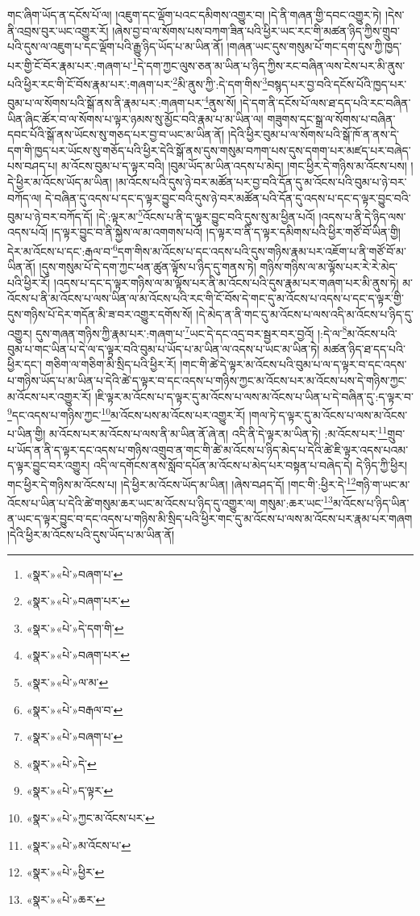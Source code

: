 གང་ཞིག་ཡོད་ན་དངོས་པོ་ལ། །འཇུག་དང་ལྡོག་པའང་དམིགས་འགྱུར་བ། །དེ་ནི་གཞན་གྱི་དབང་འགྱུར་ཏེ། །དེས་ནི་འབྲས་བུར་ཡང་འགྱུར་རོ། །ཞེས་བྱ་བ་ལ་སོགས་པས་བཀག་ཟིན་པའི་ཕྱིར་ཡང་རང་གི་མཚན་ཉིད་ཀྱིས་གྲུབ་པའི་དུས་ལ་འཇུག་པ་དང་ལྡོག་པའི་རྒྱུ་ཉིད་ཡོད་པ་མ་ཡིན་ནོ། །གཞན་ཡང་དུས་གསུམ་པོ་གང་དག་དུས་ཀྱི་ཁྱད་པར་གྱི་ངོ་བོར་རྣམ་པར་:གཞག་པ་\footnote{«སྣར་»«པེ་»བཞག་པ་}དེ་དག་ཀྱང་ལུས་ཅན་མ་ཡིན་པ་ཉིད་ཀྱིས་རང་བཞིན་ལས་ངེས་པར་མི་ནུས་པའི་ཕྱིར་རང་གི་ངོ་བོས་རྣམ་པར་:གཞག་པར་\footnote{«སྣར་»«པེ་»བཞག་པར་}མི་ནུས་ཀྱི་:དེ་དག་གིས་\footnote{«སྣར་»«པེ་»དེ་དག་གི་}བསྙད་པར་བྱ་བའི་དངོས་པོའི་ཁྱད་པར་བུམ་པ་ལ་སོགས་པའི་སྒོ་ནས་ནི་རྣམ་པར་:གཞག་པར་\footnote{«སྣར་»«པེ་»བཞག་པར་}ནུས་སོ། །དེ་དག་ནི་དངོས་པོ་ལས་ཐ་དད་པའི་རང་བཞིན་ཡིན་ཞིང་ཚོར་བ་ལ་སོགས་པ་ལྟར་ཉམས་སུ་མྱོང་བའི་རྣམ་པ་མ་ཡིན་ལ། གཟུགས་དང་སྒྲ་ལ་སོགས་པ་བཞིན་དབང་པོའི་སྒོ་ནས་ཡོངས་སུ་གཅད་པར་བྱ་བ་ཡང་མ་ཡིན་ནོ། །དེའི་ཕྱིར་བུམ་པ་ལ་སོགས་པའི་སྒོ་ཁོ་ན་ནས་དེ་དག་གི་ཁྱད་པར་ཡོངས་སུ་གཅོད་པའི་ཕྱིར་དེའི་སྒོ་ནས་དུས་གསུམ་བཀག་པས་དུས་དགག་པར་མཛད་པར་བཞེད་པས་བཤད་པ། མ་འོངས་བུམ་པ་ད་ལྟར་བའི། །བུམ་ཡོད་མ་ཡིན་འདས་པ་མེད། །གང་ཕྱིར་དེ་གཉིས་མ་འོངས་པས། །དེ་ཕྱིར་མ་འོངས་ཡོད་མ་ཡིན། །མ་འོངས་པའི་དུས་ཉེ་བར་མཚོན་པར་བྱ་བའི་དོན་དུ་མ་འོངས་པའི་བུམ་པ་ཉེ་བར་བཀོད་ལ། དེ་བཞིན་དུ་འདས་པ་དང་ད་ལྟར་བྱུང་བའི་དུས་ཉེ་བར་མཚོན་པའི་དོན་དུ་འདས་པ་དང་ད་ལྟར་བྱུང་བའི་བུམ་པ་ཉེ་བར་བཀོད་དོ། །དེ་:ལྟར་མ་\footnote{«སྣར་»«པེ་»ལ་མ་}འོངས་པ་ནི་ད་ལྟར་བྱུང་བའི་དུས་སུ་མ་ཕྱིན་པའོ། །འདས་པ་ནི་དེ་ཉིད་ལས་འདས་པའོ། །ད་ལྟར་བྱུང་བ་ནི་སྐྱེས་ལ་མ་འགགས་པའོ། །ད་ལྟར་བ་ནི་ད་ལྟར་དམིགས་པའི་ཕྱིར་གཙོ་བོ་ཡིན་གྱི། དེར་མ་འོངས་པ་དང་:རྒལ་བ་\footnote{«སྣར་»«པེ་»བརྒལ་བ་}དག་གིས་མ་འོངས་པ་དང་འདས་པའི་དུས་གཉིས་རྣམ་པར་འཇོག་པ་ནི་གཙོ་བོ་མ་ཡིན་ནོ། །དུས་གསུམ་པོ་དེ་དག་ཀྱང་ཕན་ཚུན་ལྟོས་པ་ཉིད་དུ་གནས་ཏེ། གཉིས་གཉིས་ལ་མ་ལྟོས་པར་རེ་རེ་མེད་པའི་ཕྱིར་རོ། །འདས་པ་དང་ད་ལྟར་གཉིས་ལ་མ་ལྟོས་པར་ནི་མ་འོངས་པའི་དུས་རྣམ་པར་གཞག་པར་མི་ནུས་ཏེ། མ་འོངས་པ་ནི་མ་འོངས་པ་ལས་ཡིན་ལ་མ་འོངས་པའི་རང་གི་ངོ་བོས་དེ་གང་དུ་མ་འོངས་པ་འདས་པ་དང་ད་ལྟར་གྱི་དུས་གཉིས་པོ་དེར་གདོན་མི་ཟ་བར་འགྱུར་དགོས་སོ། །དེ་མེད་ན་ནི་གང་དུ་མ་འོངས་པ་ལས་འདི་མ་འོངས་པ་ཉིད་དུ་འགྱུར། དུས་གཞན་གཉིས་ཀྱི་རྣམ་པར་:གཞག་པ་\footnote{«སྣར་»«པེ་»བཞག་པ་}ཡང་དེ་དང་འདྲ་བར་སྦྱར་བར་བྱའོ། །:དེ་ལ་\footnote{«སྣར་»«པེ་»དེ་}མ་འོངས་པའི་བུམ་པ་གང་ཡིན་པ་དེ་ལ་ད་ལྟར་བའི་བུམ་པ་ཡོད་པ་མ་ཡིན་ལ་འདས་པ་ཡང་མ་ཡིན་ཏེ། མཚན་ཉིད་ཐ་དད་པའི་ཕྱིར་དང་། གཅིག་ལ་གཅིག་མི་སྲིད་པའི་ཕྱིར་རོ། །གང་གི་ཚེ་དེ་ལྟར་མ་འོངས་པའི་བུམ་པ་ལ་ད་ལྟར་བ་དང་འདས་པ་གཉིས་ཡོད་པ་མ་ཡིན་པ་དེའི་ཚེ་ད་ལྟར་བ་དང་འདས་པ་གཉིས་ཀྱང་མ་འོངས་པར་མ་འོངས་པས་དེ་གཉིས་ཀྱང་མ་འོངས་པར་འགྱུར་རོ། །ཇི་ལྟར་མ་འོངས་པ་ད་ལྟར་དུ་མ་འོངས་པ་ལས་མ་འོངས་པ་ཡིན་པ་དེ་བཞིན་དུ་:ད་ལྟར་བ་\footnote{«སྣར་»«པེ་»ད་ལྟར་}དང་འདས་པ་གཉིས་ཀྱང་\footnote{«སྣར་»«པེ་»ཀྱང་མ་འོངས་པར་}མ་འོངས་པས་མ་འོངས་པར་འགྱུར་རོ། །གལ་ཏེ་ད་ལྟར་དུ་མ་འོངས་པ་ལས་མ་འོངས་པ་ཡིན་གྱི། མ་འོངས་པར་མ་འོངས་པ་ལས་ནི་མ་ཡིན་ནོ་ཞེ་ན། འདི་ནི་དེ་ལྟར་མ་ཡིན་ཏེ། :མ་འོངས་པར་\footnote{«སྣར་»«པེ་»མ་འོངས་པ་}གྲུབ་པ་ཡོད་ན་ནི་ད་ལྟར་དང་འདས་པ་གཉིས་འགྲུབ་ན་གང་གི་ཚེ་མ་འོངས་པ་ཉིད་མེད་པ་དེའི་ཚེ་ཇི་ལྟར་འདས་པའམ་ད་ལྟར་བྱུང་བར་འགྱུར། འདི་ལ་དགོངས་ནས་སློབ་དཔོན་མ་འོངས་པ་མེད་པར་བསྟན་པ་བཞེད་དེ། དེ་ཉིད་ཀྱི་ཕྱིར། གང་ཕྱིར་དེ་གཉིས་མ་འོངས་པ། །དེ་ཕྱིར་མ་འོངས་ཡོད་མ་ཡིན། །ཞེས་བཤད་དོ། །གང་གི་:ཕྱིར་དེ་\footnote{«སྣར་»«པེ་»ཕྱིར་}གཉི་ག་ཡང་མ་འོངས་པ་ཡིན་པ་དེའི་ཚེ་གསུམ་ཆར་ཡང་མ་འོངས་པ་ཉིད་དུ་འགྱུར་ལ། གསུམ་:ཆར་ཡང་\footnote{«སྣར་»«པེ་»ཆར་}མ་འོངས་པ་ཉིད་ཡིན་ན་ཡང་ད་ལྟར་བྱུང་བ་དང་འདས་པ་གཉིས་མི་སྲིད་པའི་ཕྱིར་གང་དུ་མ་འོངས་པ་ལས་མ་འོངས་པར་རྣམ་པར་གཞག །དེའི་ཕྱིར་མ་འོངས་པའི་དུས་ཡོད་པ་མ་ཡིན་ནོ། 